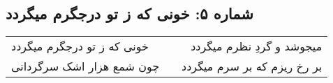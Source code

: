 \begin{center}
\section*{شماره ۵: خونی که ز تو درجگرم میگردد}
\label{sec:005}
\begin{longtable}{l p{0.5cm} r}
خونی که ز تو درجگرم میگردد
&&
میجوشد و گردِ نظرم میگردد
\\
چون شمع هزار اشک سرگردانی
&&
بر رخ ریزم که بر سرم میگردد
\\
\end{longtable}
\end{center}
